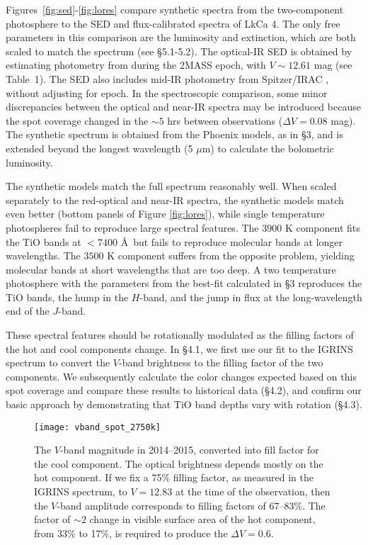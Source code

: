 \documentclass[twocolumn]{emulateapj}%
\begin{document}
Figures~\ref{fig:sed}-\ref{fig:lores} compare synthetic spectra from the two-component photosphere to the SED and flux-calibrated spectra of LkCa 4.  The only free parameters in this comparison are the luminosity and extinction, which are both scaled to match the spectrum (see \S 5.1-5.2).  The optical-IR SED is obtained by estimating photometry from \citet{grankin08} during the 2MASS epoch, with $V\sim12.61$ mag (see Table~1).  The SED also includes mid-IR photometry from Spitzer/IRAC \citep{hartmann05}, without adjusting for epoch.  In the spectroscopic comparison, some minor discrepancies between the optical and near-IR spectra may be introduced because the spot coverage changed in the $\sim 5$ hrs between observations ($\Delta V=0.08$ mag).  The synthetic spectrum is obtained from the Phoenix models, as in \S 3, and is extended beyond the longest wavelength (5 $\mu$m) to calculate the bolometric luminosity.

The synthetic models match the full spectrum reasonably well.  When scaled separately to the red-optical and near-IR spectra, the synthetic models match even better (bottom panels of Figure \ref{fig:lores}), while single temperature photospheres fail to reproduce large spectral features.   The $3900$ K component fits the TiO bands at $<7400$ \AA\ but fails to reproduce molecular bands at longer wavelengths.  The $3500$ K component suffers from the opposite problem, yielding molecular bands at short wavelengths that are too deep.  A two temperature photosphere with the parameters from the best-fit calculated in \S 3 reproduces the TiO bands, the hump in the $H$-band, and the jump in flux at the long-wavelength end of the $J$-band.

These spectral features should be rotationally modulated as the filling factors of the hot and cool components change.    In \S 4.1, we first use our fit to the IGRINS spectrum to convert the $V$-band brightness to the filling factor of the two components.  We subsequently calculate the color changes expected based on this spot coverage and compare these results to historical data (\S 4.2), and confirm our basic approach by demonstrating that TiO band depths vary with rotation (\S 4.3).



\begin{figure*}
 \centering
 \texttt{[image: vband\_spot\_2750k]}
\caption{The $V$-band magnitude in 2014--2015, converted into fill factor for the cool component.  The optical brightness depends mostly on the hot component.  If we fix a 75\% filling factor, as measured in the IGRINS spectrum, to $V=12.83$ at the time of the observation, then the $V$-band amplitude  corresponds to filling factors of 67--83\%.  The factor of $\sim 2$ change in visible surface area of the hot component, from 33\% to 17\%, is required to produce the $\Delta V=0.6$. }
\label{fig:vband_spot}
\end{figure*}
\end{document}
